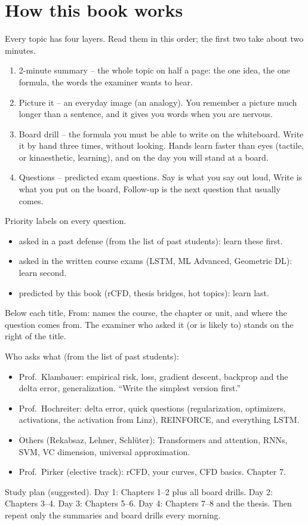 \section*{How this book works}

Every topic has four layers. Read them in this order; the first two take about two minutes.

\begin{enumerate}
\item \textsf{\color{sumcol}2-minute summary} -- the whole topic on half a page: the one idea, the
  one formula, the words the examiner wants to hear.
\item \textsf{\color{piccol}Picture it} -- an everyday image (an analogy). You remember a picture
  much longer than a sentence, and it gives you words when you are nervous.
\item \textsf{\color{brdcol}Board drill} -- the formula you must be able to write on the
  whiteboard. Write it by hand three times, without looking. Hands learn faster than eyes
  (tactile, or kinaesthetic, learning), and on the day you will stand at a board.
\item \textsf{\color{qcol}Questions} -- predicted exam questions. \textsf{Say} is what you say
  out loud, \textsf{Write} is what you put on the board, \textsf{Follow-up} is the next question
  that usually comes.
\end{enumerate}

\textsf{Priority labels on every question.}
\begin{itemize}
\item \asked asked in a past defense (from the list of past students): learn these first.
\item \cexam asked in the written course exams (LSTM, ML Advanced, Geometric DL): learn second.
\item \pred predicted by this book (rCFD, thesis bridges, hot topics): learn last.
\end{itemize}
Below each title, \textsf{From:} names the course, the chapter or unit, and where the question comes from. The examiner who asked it (or is likely to) stands on the right of the title.

\textsf{Who asks what} (from the list of past students):
\begin{itemize}
\item Prof.\ Klambauer: empirical risk, loss, gradient descent, backprop and the delta error,
  generalization. ``Write the simplest version first.''
\item Prof.\ Hochreiter: delta error, quick questions (regularization, optimizers, activations,
  the activation from Linz), REINFORCE, and everything LSTM.
\item Others (Rekabsaz, Lehner, Schl\"uter): Transformers and attention, RNNs, SVM, VC dimension,
  universal approximation.
\item Prof.\ Pirker (elective track): rCFD, your curves, CFD basics. Chapter 7.
\end{itemize}

\textsf{Study plan (suggested).} Day 1: Chapters 1--2 plus all board drills. Day 2: Chapters 3--4.
Day 3: Chapters 5--6. Day 4: Chapters 7--8 and the thesis. Then repeat only the summaries and
board drills every morning.

